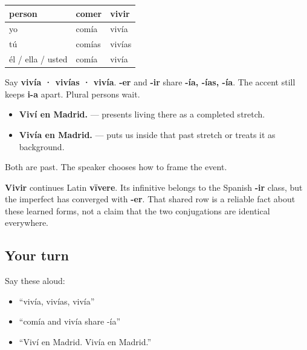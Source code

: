 \begin{grammarlens}[title={Grammar Lens: one row reused}]
\noindent
\begin{tabularx}{\linewidth}{@{}>{\raggedright\arraybackslash}X>{\raggedright\arraybackslash}X>{\raggedright\arraybackslash}X@{}}
\toprule
\textbf{person} & \textbf{comer} & \textbf{vivir} \\
\midrule
yo & comía & vivía \\
tú & comías & vivías \\
él / ella / usted & comía & vivía \\
\bottomrule
\end{tabularx}

Say \textbf{vivía · vivías · vivía}. \textbf{-er} and \textbf{-ir} share \textbf{-ía, -ías, -ía}. The accent still keeps \textbf{i-a} apart. Plural persons wait.
\end{grammarlens}

\begin{grammarlens}[title={Grammar Lens: one known contrast}]
\begin{itemize}
\raggedright
  \item \textbf{Viví en Madrid.} — presents living there as a completed stretch.
  \item \textbf{Vivía en Madrid.} — puts us inside that past stretch or treats it as background.
\end{itemize}

Both are past. The speaker chooses how to frame the event.
\end{grammarlens}

\begin{cousinweb}
\textbf{Vivir} continues Latin \textbf{vīvere}. Its infinitive belongs to the Spanish \textbf{-ir} class, but the imperfect has converged with \textbf{-er}. That shared row is a reliable fact about these learned forms, not a claim that the two conjugations are identical everywhere.
\end{cousinweb}

\subsection*{Your turn}
Say these aloud:

\begin{itemize}
\raggedright
  \item “vivía, vivías, vivía”
  \item “comía and vivía share -ía”
  \item “Viví en Madrid. Vivía en Madrid.”
\end{itemize}

